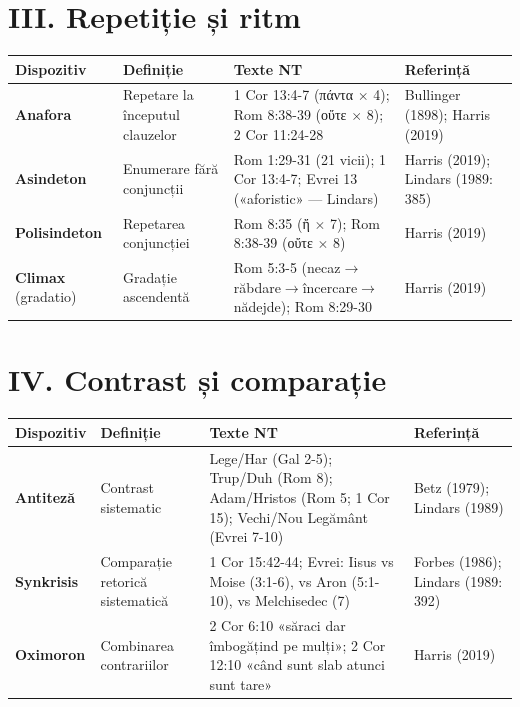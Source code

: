 \documentclass[12pt,a4paper,twoside,openany]{book}
\begin{document}
\section*{III. Repetiție și ritm}
\begin{center}
\footnotesize
\begin{tabular}{L{2.2cm}L{3cm}L{4.5cm}L{3cm}}
\toprule
{}
\textbf{Dispozitiv} & \textbf{Definiție} & \textbf{Texte NT} & \textbf{Referință} \\
\midrule
\textbf{Anafora} & Repetare la începutul clauzelor & 1 Cor 13:4-7 (πάντα $\times$ 4); Rom 8:38-39 (οὔτε $\times$ 8); 2 Cor 11:24-28 & Bullinger (1898); Harris (2019) \\
\textbf{Asindeton} & Enumerare fără conjuncții & Rom 1:29-31 (21 vicii); 1 Cor 13:4-7; Evrei 13 («aforistic» --- Lindars) & Harris (2019); Lindars (1989: 385) \\
\textbf{Polisindeton} & Repetarea conjuncției & Rom 8:35 (ἤ $\times$ 7); Rom 8:38-39 (οὔτε $\times$ 8) & Harris (2019) \\
\textbf{Climax} (gradatio) & Gradație ascendentă & Rom 5:3-5 (necaz$\rightarrow$răbdare$\rightarrow$încercare$\rightarrow$nădejde); Rom 8:29-30 & Harris (2019) \\
\bottomrule
\end{tabular}
\end{center}

\section*{IV. Contrast și comparație}
\begin{center}
\footnotesize
\begin{tabular}{L{2.2cm}L{3cm}L{4.5cm}L{3cm}}
\toprule
{}
\textbf{Dispozitiv} & \textbf{Definiție} & \textbf{Texte NT} & \textbf{Referință} \\
\midrule
\textbf{Antiteză} & Contrast sistematic & Lege/Har (Gal 2-5); Trup/Duh (Rom 8); Adam/Hristos (Rom 5; 1 Cor 15); Vechi/Nou Legământ (Evrei 7-10) & Betz (1979); Lindars (1989) \\
\textbf{Synkrisis} & Comparație retorică sistematică & 1 Cor 15:42-44; Evrei: Iisus vs Moise (3:1-6), vs Aron (5:1-10), vs Melchisedec (7) & Forbes (1986); Lindars (1989: 392) \\
\textbf{Oximoron} & Combinarea contrariilor & 2 Cor 6:10 «săraci dar îmbogățind pe mulți»; 2 Cor 12:10 «când sunt slab atunci sunt tare» & Harris (2019) \\
\bottomrule
\end{tabular}
\end{center}
\end{document}
